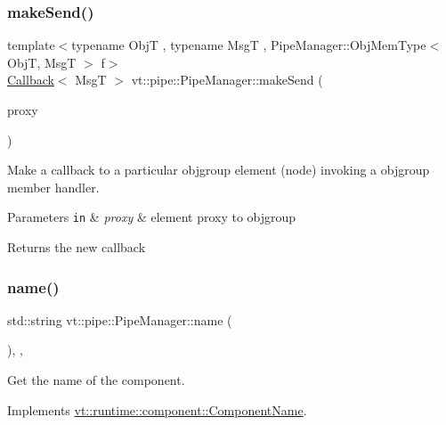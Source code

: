 \subsubsection{\texorpdfstring{make\+Send()}{makeSend()}\hspace{0.1cm}{\footnotesize\ttfamily [6/6]}}
{\footnotesize\ttfamily template$<$typename ObjT , typename MsgT , Pipe\+Manager\+::\+Obj\+Mem\+Type$<$ Obj\+T, Msg\+T $>$ f$>$ \\
\hyperlink{namespacevt_a57b238783d05de96bc2c4027f7073b7f}{Callback}$<$ MsgT $>$ vt\+::pipe\+::\+Pipe\+Manager\+::make\+Send (\begin{DoxyParamCaption}\item[{\hyperlink{structvt_1_1objgroup_1_1proxy_1_1_proxy_elm}{objgroup\+::proxy\+::\+Proxy\+Elm}$<$ ObjT $>$}]{proxy }\end{DoxyParamCaption})}



Make a callback to a particular objgroup element (node) invoking a objgroup member handler. 


\begin{DoxyParams}[1]{Parameters}
\mbox{\tt in}  & {\em proxy} & element proxy to objgroup\\
\hline
\end{DoxyParams}
\begin{DoxyReturn}{Returns}
the new callback 
\end{DoxyReturn}
\mbox{\label{structvt_1_1pipe_1_1_pipe_manager_aad60c922d604dd1b9ff47e428d265eed}} 
\subsubsection{\texorpdfstring{name()}{name()}}
{\footnotesize\ttfamily std\+::string vt\+::pipe\+::\+Pipe\+Manager\+::name (\begin{DoxyParamCaption}{ }\end{DoxyParamCaption})\hspace{0.3cm}{\ttfamily [inline]}, {\ttfamily [override]}, {\ttfamily [virtual]}}



Get the name of the component. 



Implements \hyperlink{structvt_1_1runtime_1_1component_1_1_component_name_a33c06229bb605a2b2ceff68830d6d773}{vt\+::runtime\+::component\+::\+Component\+Name}.


